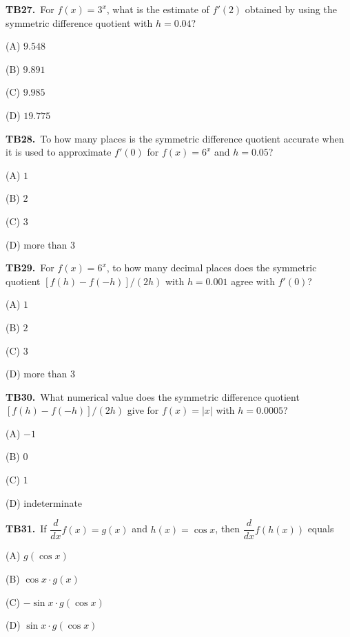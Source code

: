 \documentclass[11pt]{article}
\begin{document}
\bigskip\noindent\textbf{TB27.}\ For $f(x) = 3^x$, what is the estimate of $f'(2)$ obtained by using the symmetric difference quotient with $h=0.04$?
\begin{list}{}{\setlength{\leftmargin}{3em}\setlength{\labelwidth}{2.5em}\setlength{\itemsep}{0pt}\setlength{\topsep}{2pt}}
\item[(A)] $9.548$
\item[(B)] $9.891$
\item[(C)] $9.985$
\item[(D)] $19.775$
\end{list}

\bigskip\noindent\textbf{TB28.}\ To how many places is the symmetric difference quotient accurate when it is used to approximate $f'(0)$ for $f(x) = 6^x$ and $h = 0.05$?
\begin{list}{}{\setlength{\leftmargin}{3em}\setlength{\labelwidth}{2.5em}\setlength{\itemsep}{0pt}\setlength{\topsep}{2pt}}
\item[(A)] $1$
\item[(B)] $2$
\item[(C)] $3$
\item[(D)] more than 3
\end{list}

\bigskip\noindent\textbf{TB29.}\ For $f(x)=6^x$, to how many decimal places does the symmetric quotient $[f(h)-f(-h)]/(2h)$ with $h=0.001$ agree with $f\prime(0)$?
\begin{list}{}{\setlength{\leftmargin}{3em}\setlength{\labelwidth}{2.5em}\setlength{\itemsep}{0pt}\setlength{\topsep}{2pt}}
\item[(A)] $1$
\item[(B)] $2$
\item[(C)] $3$
\item[(D)] more than 3
\end{list}

\bigskip\noindent\textbf{TB30.}\ What numerical value does the symmetric difference quotient $[f(h)-f(-h)]/(2h)$ give for $f(x)=|x|$ with $h=0.0005$?
\begin{list}{}{\setlength{\leftmargin}{3em}\setlength{\labelwidth}{2.5em}\setlength{\itemsep}{0pt}\setlength{\topsep}{2pt}}
\item[(A)] $-1$
\item[(B)] $0$
\item[(C)] $1$
\item[(D)] indeterminate
\end{list}

\bigskip\noindent\textbf{TB31.}\ If $\dfrac{d}{dx}f(x) = g(x)$ and $h(x) = \cos x$, then $\dfrac{d}{dx}f(h(x))$ equals
\begin{list}{}{\setlength{\leftmargin}{3em}\setlength{\labelwidth}{2.5em}\setlength{\itemsep}{0pt}\setlength{\topsep}{2pt}}
\item[(A)] $g(\cos x)$
\item[(B)] $\cos x \cdot g(x)$
\item[(C)] $-\sin x \cdot g(\cos x)$
\item[(D)] $\sin x \cdot g(\cos x)$
\end{list}
\end{document}
